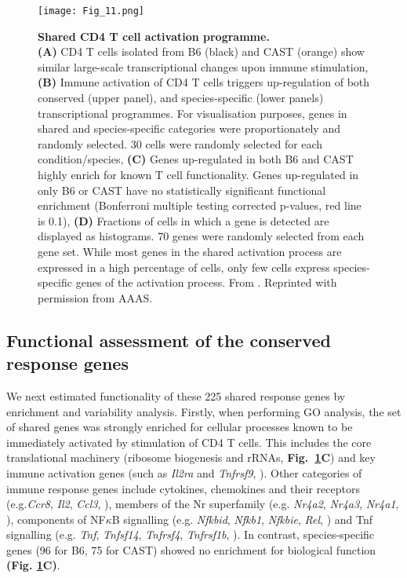 \begin{figure}[!ht]
\centering
\texttt{[image: Fig\_11.png]}
\caption[Shared CD4\plus{} T cell activation programme]{\textbf{Shared CD4\plus{} T cell activation programme.}\\
\textbf{(A)} CD4\plus{} T cells isolated from B6 (black) and CAST (orange) show similar large-scale transcriptional changes upon immune stimulation, \textbf{(B)} Immune activation of CD4\plus{} T cells triggers up-regulation of both conserved (upper panel), and species-specific (lower panels) transcriptional programmes. For visualisation purposes, genes in shared and species-specific categories were proportionately and randomly selected. 30 cells were randomly selected for each condition/species, \textbf{(C)} Genes up-regulated in both B6 and CAST highly enrich for known T cell functionality. Genes up-regulated in only B6 or CAST have no statistically significant functional enrichment (Bonferroni multiple testing corrected p-values, red line is 0.1), \textbf{(D)} Fractions of cells in which a gene is detected are displayed as histograms. 70 genes were randomly selected from each gene set. While most genes in the shared activation process are expressed in a high percentage of cells, only few cells express species-specific genes of the activation process. From \citep{Martinez-jimenez2017}. Reprinted with permission from AAAS.}
\label{fig1:shared_activation}
\end{figure}

\newpage

\subsection{Functional assessment of the conserved response genes}

We next estimated functionality of these 225 shared response genes by enrichment and variability analysis. Firstly, when performing GO analysis, the set of shared genes was strongly enriched for cellular processes known to be immediately activated by stimulation of CD4\plus{} T cells. This includes the core translational machinery (ribosome biogenesis and \glspl{rRNA}, \textbf{Fig.~\ref{fig1:shared_activation}C}) and key immune activation genes (such as \textit{Il2ra} and \textit{Tnfrsf9}, \citep{Asmal2003}). Other categories of immune response genes include cytokines, chemokines and their receptors (e.g.\textit{Ccr8}, \textit{Il2}, \textit{Ccl3}, \citep{Turner2014}), members of the \gls{Nr} superfamily (e.g. \textit{Nr4a2}, \textit{Nr4a3}, \textit{Nr4a1}, \citep{Glass2010}), components of NF$\kappa$B signalling (e.g. \textit{Nfkbid}, \textit{Nfkb1}, \textit{Nfkbie}, \textit{Rel}, \citep{Gerondakis2010}) and Tnf signalling (e.g. \textit{Tnf}, \textit{Tnfsf14}, \textit{Tnfrsf4}, \textit{Tnfrsf1b}, \citep{Croft2009}). In contrast, species-specific genes (96 for B6, 75 for CAST) showed no enrichment for biological function \textbf{(Fig. \ref{fig1:shared_activation}C)}. \\

